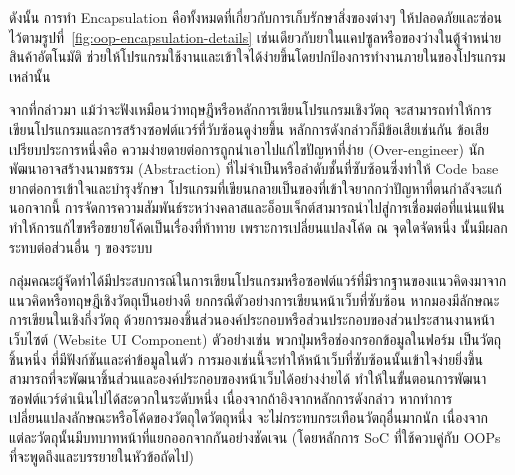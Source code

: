 \documentclass[12pt,one side,openright,a4paper]{cpe-thesis-th}
\newcommand{\thaijustify}[1]{%
  \par\hspace{30pt}\justifying
  #1
}
\begin{document}
\thaijustify{
  ดังนั้น การทำ Encapsulation คือทั้งหมดที่เกี่ยวกับการเก็บรักษาสิ่งของต่างๆ ให้ปลอดภัยและซ่อนไว้ตามรูปที่~\ref{fig:oop-encapsulation-details} เช่นเดียวกับยาในแคปซูลหรือของว่างในตู้จำหน่ายสินค้าอัตโนมัติ ช่วยให้โปรแกรมใช้งานและเข้าใจได้ง่ายขึ้นโดยปกป้องการทำงานภายในของโปรแกรมเหล่านั้น~\cite{nishad22encapsulation}
}
\thaijustify{
  จากที่กล่าวมา แม้ว่าจะฟังเหมือนว่าทฤษฎีหรือหลักการเขียนโปรแกรมเชิงวัตถุ จะสามารถทำให้การเขียนโปรแกรมและการสร้างซอฟต์แวร์ที่วับซ้อนดูง่ายขึ้น หลักการดังกล่าวก็มีข้อเสียเช่นกัน ข้อเสียเปรียบประการหนึ่งคือ ความง่ายดายต่อการถูกนำเอาไปแก้ไขปัญหาที่ง่าย (Over-engineer) นักพัฒนาอาจสร้างนามธรรม (Abstraction) ที่ไม่จำเป็นหรือลำดับชั้นที่ซับซ้อนซึ่งทำให้ Code base ยากต่อการเข้าใจและบำรุงรักษา โปรแกรมที่เขียนกลายเป็นของที่เข้าใจยากกว่าปัญหาที่ตนกำลังจะแก้~\cite{thomas99pragmatic} นอกจากนี้ การจัดการความสัมพันธ์ระหว่างคลาสและอ็อบเจ็กต์สามารถนำไปสู่การเชื่อมต่อที่แน่นแฟ้น ทำให้การแก้ไขหรือขยายโค้ดเป็นเรื่องที่ท้าทาย เพราะการเปลี่ยนแปลงโค้ด ณ จุดใดจัดหนึ่ง นั้นมีผลกระทบต่อส่วนอื่น ๆ ของระบบ~\cite{fowler13oop}
}
\thaijustify{
  กลุ่มคณะผู้จัดทำได้มีประสบการณ์ในการเขียนโปรแกรมหรือซอฟต์แวร์ที่มีรากฐานของแนวคิดงมาจากแนวคิดหรือทฤษฎีเชิงวัตถุเป็นอย่างดี ยกกรณีตัวอย่างการเขียนหน้าเว็บที่ซับซ้อน หากมองมีลักษณะการเขียนในเชิงกึ่งวัตถุ ด้วยการมองชิ้นส่วนองค์ประกอบหรือส่วนประกอบของส่วนประสานงานหน้าเว็บไซต์ (Website UI Component) ตัวอย่างเช่น พวกปุ่มหรือช่องกรอกข้อมูลในฟอร์ม เป็นวัตถุชิ้นหนึ่ง ที่มีฟังก์ชันและค่าข้อมูลในตัว การมองเช่นนี้จะทำให้หน้าเว็บที่ซับซ้อนนั้นเข้าใจง่ายยิ่งขึ้น สามารถที่จะพัฒนาชิ้นส่วนและองค์ประกอบของหน้าเว็บได้อย่างง่ายได้ ทำให้ในขั้นตอนการพัฒนาซอฟต์แวร์ดำเนินไปได้สะดวกในระดับหนึ่ง เนื่องจากถ้าอิงจากหลักการดังกล่าว หากทำการเปลี่ยนแปลงลักษณะหรือโค้ดของวัตถุใดวัตถุหนึ่ง จะไม่กระทบกระเทือนวัตถุอื่นมากนัก เนื่องจากแต่ละวัตถุนั้นมีบทบาทหน้าที่แยกออกจากกันอย่างชัดเจน (โดยหลักการ SoC ที่ใช้ควบคู่กับ OOPs ที่จะพูดถึงและบรรยายในหัวข้อถัดไป)
}
\end{document}
